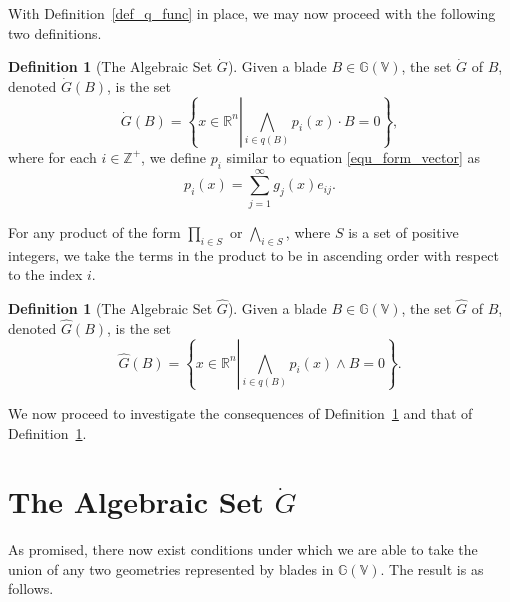 \documentclass{birkjour}
\theoremstyle{definition}
\newtheorem{defn}[thm]{Definition}
\theoremstyle{remark}
\numberwithin{equation}{section}
\newcommand{\G}{\mathbb{G}}
\newcommand{\V}{\mathbb{V}}
\newcommand{\R}{\mathbb{R}}
\newcommand{\Z}{\mathbb{Z}}
\newcommand{\Gi}{\dot{G}}
\newcommand{\Go}{\hat{G}}
\begin{document}
With Definition~\ref{def_q_func} in place, we may now proceed with the following two definitions.

\begin{defn}[The Algebraic Set $\Gi$]\label{def_gi}
Given a blade $B\in\G(\V)$, the set $\Gi$ of $B$, denoted $\Gi(B)$, is the set
\begin{equation}
\Gi(B) = \left\{x\in\R^n\left|\bigwedge_{i\in q(B)} p_i(x)\cdot B=0\right.\right\},
\end{equation}
where for each $i\in\Z^+$, we define $p_i$ similar to equation \eqref{equ_form_vector} as
\begin{equation}
p_i(x) = \sum_{j=1}^\infty g_j(x)e_{ij}.
\end{equation}
\end{defn}
For any product of the form $\prod_{i\in S}$ or $\bigwedge_{i\in S}$, where $S$ is
a set of positive integers, we take the terms in the product to be in ascending order
with respect to the index $i$.

\begin{defn}[The Algebraic Set $\Go$]\label{def_go}
Given a blade $B\in\G(\V)$, the set $\Go$ of $B$, denoted $\Go(B)$, is the set
\begin{equation}
\Go(B) = \left\{x\in\R^n\left|\bigwedge_{i\in q(B)}p_i(x)\wedge B=0\right.\right\}.
\end{equation}
\end{defn}

We now proceed to investigate the consequences of Definition~\ref{def_gi}
and that of Definition~\ref{def_go}.

\section{The Algebraic Set $\Gi$}

As promised, there now exist conditions under which we are able to take the
union of any two geometries represented by blades in $\G(\V)$.  The result is
as follows.
\end{document}
